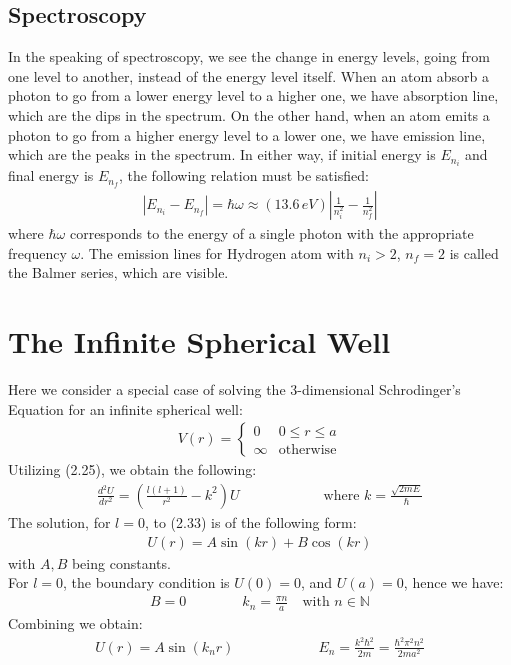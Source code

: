 \documentclass[11pt]{book}
\theoremstyle{break}
\theoremstyle{break}
\newcommand{\N}{\mathbb{N}}
\begin{document}
\subsection{Spectroscopy}
In the speaking of spectroscopy, we see the change in energy levels, going from one level to another, instead of the energy level itself. When an atom absorb a photon to go from a lower energy level to a higher one, we have absorption line, which are the dips in the spectrum. On the other hand, when an atom emits a photon to go from a higher energy level to a lower one, we have emission line, which are the peaks in the spectrum. In either way, if initial energy is $E_{n_i}$ and final energy is $E_{n_f}$,  the following relation must be satisfied:
\begin{align*}
|E_{n_i} - E_{n_f}| = \hbar \omega \approx \left(13.6\, eV\right) \left| \frac{1}{n_i^2} - \frac{1}{n_f^2}\right|
\end{align*}
where $\hbar\omega$ corresponds to the energy of a single photon with the appropriate frequency $\omega$. The emission lines for Hydrogen atom with $n_i > 2$, $n_f = 2$ is called the Balmer series, which are visible. 


\newpage
\section[The Infinite Spherical Well]{\color{red}The Infinite Spherical Well \color{black}}
Here we consider a special case of solving the $3$-dimensional Schrodinger's Equation for an infinite spherical well:
\begin{align*}
V(r) = 
\begin{cases}
0 & 0\leq r\leq a\\
\infty & \text{otherwise}
\end{cases}
\end{align*}
Utilizing (2.25), we obtain the following:
\begin{align}
\frac{d^2U}{dr^2} = \left( \frac{l(l+1)}{r^2} - k^2 \right) U \qquad\qquad\qquad \text{where }k = \frac{\sqrt{2mE}}{\hbar}
\end{align}
The solution, for $l=0$, to (2.33) is of the following form:
\begin{align*}
U(r) = A\sin(kr) + B\cos(kr)
\end{align*}
with $A,B$ being constants. \\

For $l=0$, the boundary condition is $U(0) = 0$, and $U(a) = 0$, hence we have:
\begin{align}
B = 0\qquad\qquad k_n = \frac{\pi n}{a}\quad \text{with }n\in \N
\end{align}
Combining we obtain:
\begin{align*}
U(r) = A\sin(k_n r) \qquad\qquad\qquad E_n = \frac{k^2 \hbar^2}{2m} = \frac{\hbar^2 \pi^2 n^2}{2ma^2}
\end{align*}
\end{document}
